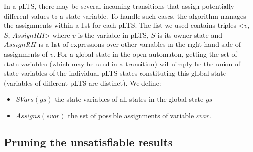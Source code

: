 \documentclass{lncs/llncs}
\newcommand{\QIN}[1]{\textcolor{airforceblue}{#1}}
\begin{document}
In a pLTS, there may be several incoming transitions 
that assign potentially different values to a state variable.
To handle such cases, the algorithm manages the assignments
within a list for each pLTS.
The list we used contains triples <$v$, $S$, $AssignRH$> 
where $v$ is the variable in pLTS, $S$ is its owner state and
$AssignRH$ is a list of expressions over other variables in the right
hand side of assignments of $v$.
For a global state in the open automaton, getting the set of state
variables (which may be used in a transition) will simply be the union
of state variables of the individual pLTS states constituting this
global state (variables of different pLTS are distinct). We define:
\begin{itemize}
  \item $SVars(gs)$ the state variables of all states in the global
    state $gs$
  \item $Assigns(svar)$ the set of possible assignments of variable
      $svar$.
\end{itemize}




\subsection{Pruning the unsatisfiable results}
\label{section:pruning}
\end{document}
